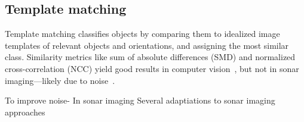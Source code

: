 {\subsection{Template matching}
 
Template matching classifies objects by comparing them to idealized image templates of relevant objects and orientations, and assigning the most similar class. Similarity metrics like sum of absolute differences (SMD) and normalized cross-correlation (NCC) yield good results in computer vision~\cite{Brunelli2009}, but not in sonar imaging---likely due to noise~\cite{Myers2007}. 


To improve noise- In sonar imaging Several adaptiations to sonar imaging approaches 









}
